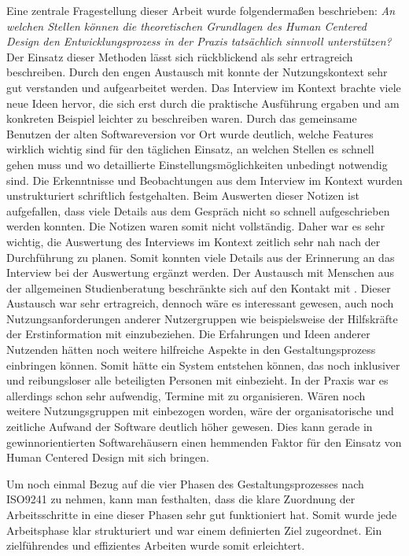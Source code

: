 Eine zentrale Fragestellung dieser Arbeit wurde folgendermaßen beschrieben: \textit{An welchen Stellen können die theoretischen Grundlagen des
    Human Centered Design den Entwicklungsprozess in der Praxis tatsächlich
    sinnvoll unterstützen?} Der Einsatz dieser Methoden lässt sich rückblickend als
sehr ertragreich beschreiben. Durch den engen Austausch mit \ipName konnte der
Nutzungskontext sehr gut verstanden und aufgearbeitet werden. Das Interview im
Kontext brachte viele neue Ideen hervor, die sich erst durch die praktische Ausführung ergaben und am konkreten Beispiel leichter zu beschreiben waren. Durch das gemeinsame
Benutzen der alten Softwareversion vor Ort wurde deutlich, welche
Features wirklich wichtig sind für den täglichen Einsatz, an welchen Stellen es
schnell gehen muss und wo detaillierte Einstellungsmöglichkeiten unbedingt
notwendig sind. Die Erkenntnisse und Beobachtungen aus dem Interview im Kontext
wurden unstrukturiert schriftlich festgehalten. Beim Auswerten dieser Notizen
ist aufgefallen, dass viele Details aus dem Gespräch nicht so schnell
aufgeschrieben werden konnten. Die Notizen waren somit nicht vollständig.
Daher war es sehr wichtig, die Auswertung des Interviews im Kontext zeitlich
sehr nah nach der Durchführung zu planen. Somit konnten viele Details aus der
Erinnerung an das Interview bei der Auswertung ergänzt werden. Der
Austausch mit Menschen aus der allgemeinen Studienberatung beschränkte sich auf den Kontakt
mit \ipName. Dieser Austausch war sehr ertragreich, dennoch wäre es
interessant gewesen, auch noch Nutzungsanforderungen anderer Nutzergruppen wie
beispielsweise der Hilfskräfte der Erstinformation mit einzubeziehen. Die
Erfahrungen und Ideen anderer Nutzenden hätten noch weitere hilfreiche Aspekte
in den Gestaltungsprozess einbringen können. Somit hätte ein System entstehen
können, das noch inklusiver und reibungsloser alle beteiligten Personen mit
einbezieht. In der Praxis war es allerdings schon sehr aufwendig, Termine mit
\ipName zu organisieren. Wären noch weitere Nutzungsgruppen mit einbezogen
worden, wäre der organisatorische und zeitliche Aufwand der Software deutlich
höher gewesen. Dies kann gerade in gewinnorientierten Softwarehäusern einen
hemmenden Faktor für den Einsatz von Human Centered Design mit sich bringen.

Um noch einmal Bezug auf die vier Phasen des Gestaltungsprozesses nach ISO9241
zu nehmen, kann man festhalten, dass die klare Zuordnung der Arbeitsschritte in
eine dieser Phasen sehr gut funktioniert hat. Somit wurde jede Arbeitsphase
klar strukturiert und war einem definierten Ziel zugeordnet. Ein
zielführendes und effizientes Arbeiten wurde somit erleichtert.

